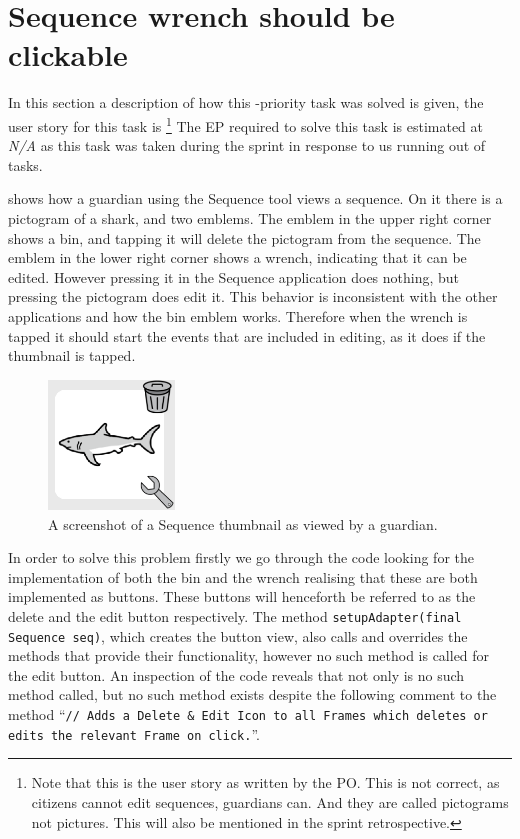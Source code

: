 \section{Sequence wrench should be clickable}
In this section a description of how this \phigh-priority task was solved is given, the user story for this task is \footnote{Note that this is the user story as written by the PO. This is not correct, as citizens cannot edit sequences, guardians can. And they are called pictograms not pictures. This will also be mentioned in the sprint retrospective. }
The EP required to solve this task is estimated at \textit{N/A} as this task was taken during the sprint in response to us running out of tasks.

 shows how a guardian using the Sequence tool views a sequence.
On it there is a pictogram of a shark, and two emblems.
The emblem in the upper right corner shows a bin, and tapping it will delete the pictogram from the sequence.
The emblem in the lower right corner shows a wrench, indicating that it can be edited.
However pressing it in the Sequence application does nothing, but pressing the pictogram does edit it.
This behavior is inconsistent with the other applications and how the bin emblem works.
Therefore when the wrench is tapped it should start the events that are included in editing, as it does if the thumbnail is tapped.
\begin{figure}
    \centering
    \includegraphics[width=0.3\textwidth]{figures/img/screenshots/Sequence_pictogram.png}
    \caption{A screenshot of a Sequence thumbnail as viewed by a guardian.}\label{fig:seq_wrench}
    \vspace{-5pt}
\end{figure}
\bigskip
\noindent
In order to solve this problem firstly we go through the code looking for the implementation of both the bin and the wrench realising that these are both implemented as buttons.
These buttons will henceforth be referred to as the delete and the edit button respectively.
The method \texttt{setupAdapter(final Sequence seq)}, which creates the button view, also calls and overrides the methods that provide their functionality, however no such method is called for the edit button.
An inspection of the code reveals that not only is no such method called, but no such method exists despite the following comment to the method \enquote{\texttt{// Adds a Delete \& Edit Icon to all Frames which deletes or edits the relevant Frame on click.}}.

